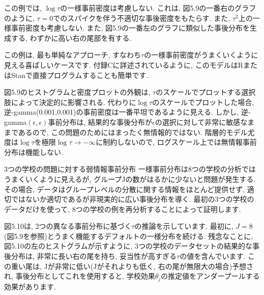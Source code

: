\documentclass[10pt,dvipdfmx,a4]{beamer}
\begin{document}
\begin{frame}
この例では, $\log\tau$の一様事前密度は考慮しない.
これは, 図5.9の一番右のグラフのように, $\tau=0$でのスパイクを伴う不適切な事後密度をもたらす.
また, $\tau^2$上の一様事前密度も考慮しない.
また, 図5.9の一番左のグラフに類似した事後分布を生成する, わずかに高い右の尾部を有する.

この例は, 最も単純なアプローチ, すなわち$\tau$の一様事前密度がうまくいくように見える喜ばしいケースです.
付録Cに詳述されているように, このモデルはRまたはStanで直接プログラムすることも簡単です.

図5.9のヒストグラムと密度プロットの外観は, $\tau$のスケールでプロットする選択肢によって決定的に影響される.
代わりに$\log\tau$のスケールでプロットした場合, 逆-gamma(0.001,0.001)の事前密度は一番平坦であるように見える.
しかし, 逆-gamma$(\epsilon, \epsilon)$事前分布は, 結果的な事後分布が$\epsilon$の選択に対して非常に敏感なままであるので, この問題のためにはまったく無情報的ではない.
階層的モデル尤度は$\log\tau$を極限$\log\tau\rightarrow-\infty$に制約しないので, ログスケール上では無情報事前分布は機能しない.
\end{frame}


\begin{frame}{3つの学校の問題に対する弱情報事前分布}
一様事前分布は8つの学校の分析ではうまくいくように見えるが, グループJの数がはるかに少ないと問題が発生する.
その場合, データはグループレベルの分散に関する情報をほとんど提供せず, 適切ではないか適切であるが非現実的に広い事後分布を導く.
最初の3つの学校のデータだけを使って, 8つの学校の例を再分析することによって証明します.

図5.10は, 2つの異なる事前分布に基づく$\tau$の推論を示しています.
最初に, $J=8$(図5.9を参照)とうまく機能するデフォルトの一様分布を続ける.
残念なことに, 図5.10の左のヒストグラムが示すように, 3つの学校のデータセットの結果的な事後分布は, 非常に長い右の尾を持ち, 妥当性が高すぎる$\tau$の値を含んでいます.
この重い尾は, Jが非常に低い(Jがそれよりも低く, 右の尾が無限大の場合)予想され, 事後分布としてこれを使用すると, 学校効果$\theta_j$の推定値をアンダープールする効果があります.
\end{frame}

\end{document}
